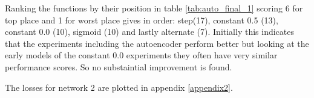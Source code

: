       Ranking the functions by their position in table \ref{tab:auto_final_1} scoring 6 for top place and 1 for worst place gives in order:
      step(17), constant 0.5 (13), constant 0.0 (10), sigmoid (10) and lastly alternate (7). Initially this indicates that the
      experiments including the autoencoder perform better but looking at the early models of the constant 0.0 experiments
      they often have very similar performance scores. So no substaintial improvement is found.

      The losses for network 2 are plotted in appendix \ref{appendix2}.

